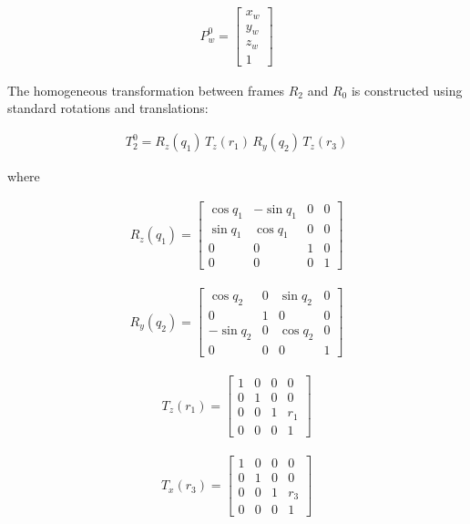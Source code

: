 \documentclass[12pt, a4paper]{article}
\begin{document}
\begin{align}
P_w^{0} =
\begin{bmatrix}
x_w\\
y_w\\
z_w\\
1
\end{bmatrix}
\end{align}

The homogeneous transformation between frames \(R_2\) and \(R_0\) is constructed using standard rotations and translations:

\begin{align}
T_{2}^0
=
R_z(q_1)\,
T_z(r_1)\,
R_y(q_2)\,
T_z(r_3)
\end{align}

where

\begin{align}
R_z(q_1)=
\begin{bmatrix}
\cos q_1 & -\sin q_1 & 0 & 0\\
\sin q_1 & \cos q_1 & 0 & 0\\
0 & 0 & 1 & 0\\
0 & 0 & 0 & 1
\end{bmatrix}
\end{align}

\begin{align}
R_y(q_2)=
\begin{bmatrix}
\cos q_2 & 0 & \sin q_2 & 0\\
0 & 1 & 0 & 0\\
-\sin q_2 & 0 & \cos q_2 & 0\\
0 & 0 & 0 & 1
\end{bmatrix}
\end{align}

\begin{align}
T_z(r_1)=
\begin{bmatrix}
1 & 0 & 0 & 0\\
0 & 1 & 0 & 0\\
0 & 0 & 1 & r_1\\
0 & 0 & 0 & 1
\end{bmatrix}
\end{align}

\begin{align}
T_x(r_3)=
\begin{bmatrix}
1 & 0 & 0 & 0\\
0 & 1 & 0 & 0\\
0 & 0 & 1 & r_3\\
0 & 0 & 0 & 1
\end{bmatrix}
\end{align}
\end{document}
